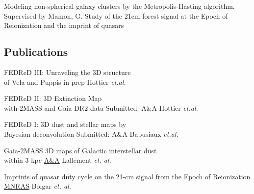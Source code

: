 \documentclass[
 a4paper, 10.0pt,
  sidebarwidth=0.3\paperwidth,
]{fortysecondscv}
\begin{document}
\makefrontsidebar

\begin{cvtable}
  {Modeling non-spherical galaxy clusters by the Metropolis-Hasting algorithm. Supervised by
  Mamon, G.}
  {Study of the 21cm forest signal at the Epoch of Reionization and the imprint of quasars}
\end{cvtable}


\begin{cvtable}
\end{cvtable}

\subsection{Publications}
\begin{cvtable}
  {FEDReD III: Unraveling the 3D structure \\of Vela and Puppis}
  {in prep}
  {Hottier \textit{et.al.}}

  {FEDReD II: 3D Extinction Map\\ with 2MASS and Gaia DR2 data}
  {Submitted: A\&A}
  {Hottier \textit{et.al.}}

  {FEDReD I: 3D dust and stellar maps by \\Bayesian deconvolution}
  {Submitted: A\&A}
  {Babusiaux \textit{et.al.}}

  {Gaia-2MASS 3D maps of Galactic interstellar dust\\within 3 kpc}
  {\href{https://ui.adsabs.harvard.edu/\#abs/2019arXiv190204116L/abstract}{\underline{A\&A}}}
  {Lallement \textit{et. al.}}

  {Imprints of quasar duty cycle on the 21-cm signal from the Epoch of Reionization}
  {\href{https://ui.adsabs.harvard.edu/\#abs/2019arXiv190204116L/abstract}{\underline{MNRAS}}}
  {Bolgar \textit{et. al.}}
\end{cvtable}
\end{document}
